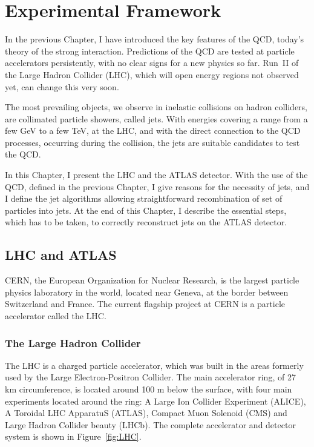 \chapter{Experimental Framework}


In the previous Chapter, I have introduced the key features of the QCD, today's
theory of the strong interaction. Predictions of the QCD are tested at particle
accelerators persistently, with no clear signs for a new physics so far. 
Run~II of the Large Hadron Collider (LHC), which will open energy regions not
observed yet, can change this very soon.

The most prevailing objects, we observe in inelastic collisions on hadron
colliders, are collimated particle showers, called jets. With energies covering
a range from a few GeV to a few TeV, at the LHC, and with the
direct connection to the QCD processes, occurring during the collision, the jets
are suitable candidates to test the QCD.

In this Chapter, I present the LHC and the ATLAS detector.
With the use of the QCD, defined in the previous Chapter, I give reasons for the
necessity of jets, and I define the jet algorithms allowing straightforward
recombination of set of particles into jets.
At the end of this Chapter, I describe the essential
steps, which has to be taken, to correctly reconstruct jets on the ATLAS
detector.

\section{LHC and ATLAS}

CERN, the European Organization for Nuclear Research, is the largest particle
physics laboratory in the world, located near Geneva, at the border between
Switzerland and France. The current flagship project at CERN is a particle
accelerator called the LHC.

\subsection{The Large Hadron Collider}

The LHC \cite{LHC, LHCPastPresentFuture} is a charged
particle accelerator, which was built in the areas formerly used by the Large
Electron-Positron Collider.  The main accelerator ring, of 27 km circumference,
is located around 100 m below the surface, with four main experiments located
around the ring: A Large Ion Collider Experiment (ALICE), A Toroidal LHC
ApparatuS (ATLAS), Compact Muon Solenoid (CMS) and Large Hadron Collider beauty
(LHCb). The complete accelerator and detector system is shown in
Figure~\ref{fig:LHC}.


